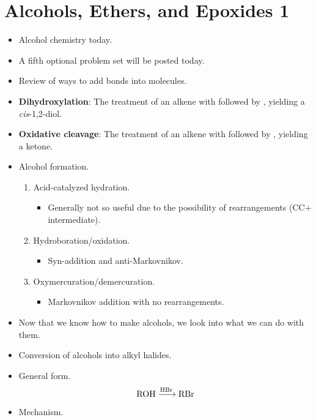 \documentclass[../notes.tex]{subfiles}
\begin{document}
\section{Alcohols, Ethers, and Epoxides 1}
\begin{itemize}
    \item {}Alcohol chemistry today.
    \item A fifth optional problem set will be posted today.
    \item Review of ways to add  bonds into molecules.
    \item \textbf{Dihydroxylation}: The treatment of an alkene with  followed by , yielding a \emph{cis}-1,2-diol.
    \item \textbf{Oxidative cleavage}: The treatment of an alkene with  followed by , yielding a ketone.
    \item Alcohol formation.
    \begin{enumerate}
        \item Acid-catalyzed hydration.
        \begin{itemize}
            \item Generally not so useful due to the possibility of rearrangements (CC+ intermediate).
        \end{itemize}
        \item Hydroboration/oxidation.
        \begin{itemize}
            \item Syn-addition and anti-Markovnikov.
        \end{itemize}
        \item Oxymercuration/demercuration.
        \begin{itemize}
            \item Markovnikov addition with no rearrangements.
        \end{itemize}
    \end{enumerate}
    \item Now that we know how to make alcohols, we look into what we can do with them.
    \item Conversion of alcohols into alkyl halides.
    \item General form.
    \begin{equation*}
        \ce{ROH ->[HBr] RBr}
    \end{equation*}
    \item Mechanism.
    \begin{itemize}

\end{itemize}
\end{itemize}
\end{document}

